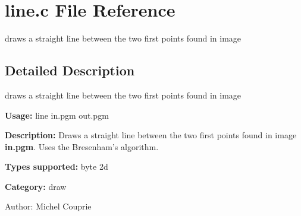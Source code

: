 \section{line.c File Reference}
\label{line_8c}
draws a straight line between the two first points found in image 



\subsection{Detailed Description}
draws a straight line between the two first points found in image 

{\bf Usage:} line in.pgm out.pgm

{\bf Description:} Draws a straight line between the two first points found in image {\bf in.pgm}. Uses the Bresenham's algorithm.

{\bf Types supported:} byte 2d

{\bf Category:} draw

\begin{Desc}
\item[Author:]Michel Couprie \end{Desc}
